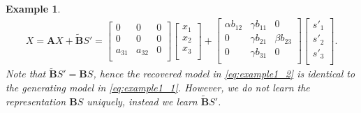 \documentclass[12pt]{article}
\newtheorem{example}{Example}
\newcommand{\bA}{\mathbf{A}}
\newcommand{\bB}{\mathbf{B}}
\begin{document}
\begin{example}
\begin{align}
\label{eq:example1_2}
X = \bA X+\tilde{\bB} S'
=
\begin{bmatrix}
0 & 0 & 0 \\
0 & 0 & 0 \\
a_{31} & a_{32} & 0 \\
\end{bmatrix}
\begin{bmatrix}
x_1 \\
x_2 \\
x_3 \\
\end{bmatrix}
+
\begin{bmatrix}
\alpha b_{12} & \gamma b_{11} & 0 \\
0 & \gamma b_{21} & \beta b_{23} \\
0 & \gamma b_{31} & 0 \\
\end{bmatrix}
\begin{bmatrix}
s'_1 \\
s'_2 \\
s'_3 \\
\end{bmatrix}
.
\end{align}
Note that $\tilde{\bB}S'=\bB S$, hence the recovered model in \eqref{eq:example1_2} is identical to the generating model in \eqref{eq:example1_1}. However, we do not learn the representation $\bB S$ uniquely, instead we learn $\tilde{\bB} S'$. 
\end{example}
\end{document}
